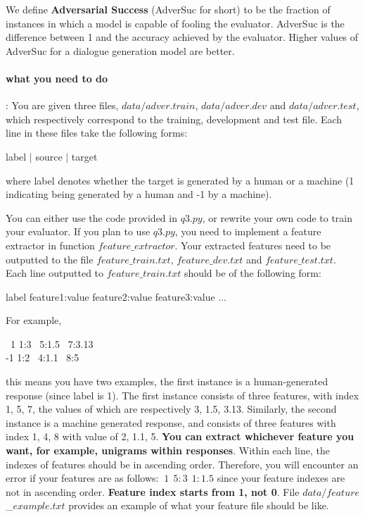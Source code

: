 \documentclass{article}
\begin{document}
We define {\bf Adversarial Success} (AdverSuc for
short) to be the fraction of instances in which a
model is capable of fooling the evaluator. AdverSuc
is the difference between 1 and the accuracy
achieved by the evaluator. Higher values of AdverSuc
for a dialogue generation model are better. 
\paragraph{ what you need to do}:
You are given three files, $data/adver.train$, $data/adver.dev$ and $data/adver.test$, which respectively correspond to the training, development and test file. 
Each line in these files take the following forms:
\begin{center}
label $|$ source $|$ target
\end{center}
where label denotes whether the target is generated by a human or a machine (1 indicating being generated by a human and -1 by a machine). 

You can either use the code provided in $q3.py$, or rewrite your own code to train your evaluator. If you plan to use $q3.py$, you need to implement a feature extractor in function $feature\_extractor$. 
Your extracted features need to be outputted to the file $feature\_train.txt$, $feature\_dev.txt$ and $feature\_test.txt$. Each line outputted to  $feature\_train.txt$ should be of the following form:
\begin{center}
label feature1:value feature2:value feature3:value ...
\end{center}
For example, 
\begin{center}
~1 1:3 ~5:1.5 ~7:3.13~ \\
-1 1:2 ~4:1.1 ~8:5~
\end{center}
this means you have two examples, the first instance is a human-generated response (since label is 1). The first instance consists of three features, with index 1, 5, 7, the values of which 
are respectively 3, 1.5, 3.13. Similarly, the second instance is a machine generated response, and consists of three features with index 1, 4, 8 with value of 2, 1.1, 5.
{\bf You can extract whichever feature you want, for example, unigrams within responses}. 
Within each line, the indexes of features should be in ascending order. 
Therefore,
you will encounter an error if your features are as follows: 
$~1~~5:3~~1:1.5$ since your feature indexes are not in ascending order. 
{\bf Feature index starts from 1, not 0}.
File $data/feature$\_$example.txt$ provides an example of what your feature file should be like. 
\end{document}
